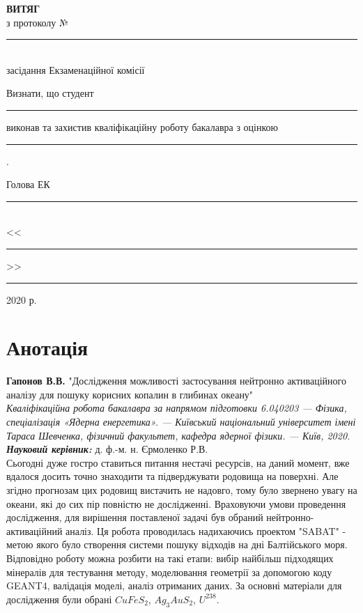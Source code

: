 \documentclass[a4paper, 14pt]{article}
\numberwithin{equation}{section}
\numberwithin{table}{section}
\begin{document}
	\begin{titlepage}
		\renewcommand{\baselinestretch}{1.0}
		\newcommand{\ul}[1]{\rule{#1}{0.1pt}}
		\begin{spacing}{1.8}
			\vspace*{4.5cm}
			{\center
				{\bf ВИТЯГ}\\
				з протоколу № \ul{2.4cm}\\
				засідання Екзаменаційної комісії\\[2cm]}
			{\noindent
				Визнати, що студент \ul{7.2cm} виконав та захистив кваліфікаційну роботу бакалавра з оцінкою \ul{7.2cm} .\\[1cm]}
			{\flushright
				Голова ЕК \ul{7.8cm}\\
				<<\ul{1cm}>> \ul{4cm} 2020 р.\\}
		\end{spacing}
	\end{titlepage}
	
	
	\pagestyle{empty}
	
	\section*{Анотація}
	
	{\bf Гапонов В.В.} "Дослідження можливості застосування нейтронно активаційного аналізу для пошуку корисних копалин в глибинах океану"\\
	{\itshape Кваліфікаційна робота бакалавра за напрямом підготовки 6.040203 --- Фізика, спеціалізація «Ядерна енергетика». --- Київський національний університет імені Тараса Шевченка, фізичний факультет, кафедра ядерної фізики. --- Київ, 2020.} \\
	{\itshape \bfseries Науковий керівник:} д. ф.-м. н. Єрмоленко Р.В.%
	\\[0.5cm]
	Сьогодні дуже гостро ставиться питання нестачі ресурсів, на даний момент, вже вдалося досить точно знаходити та підверджувати родовища на поверхні. Але згідно прогнозам цих родовищ вистачить не надовго, тому було звернено увагу на океани, які до сих пір повністю не дослідженні. 
	Враховуючи умови проведення дослідження, для вирішення поставленої задачі був обраний нейтронно-активаційний аналіз. Ця робота проводилась надихаючись проектом "SABAT" - метою якого було створення системи пошуку відходів на дні Балтійського моря. Відповідно роботу можна розбити на такі етапи: вибір найбільш підходящих мінералів для тестування методу, моделювання геометрії за допомогою коду GEANT4, валідація моделі, аналіз отриманих даних. За основні матеріали для дослідження були обрані $CuFeS_2$, $Ag_3AuS_2$, $U^{238}$. 
	
\end{document}
